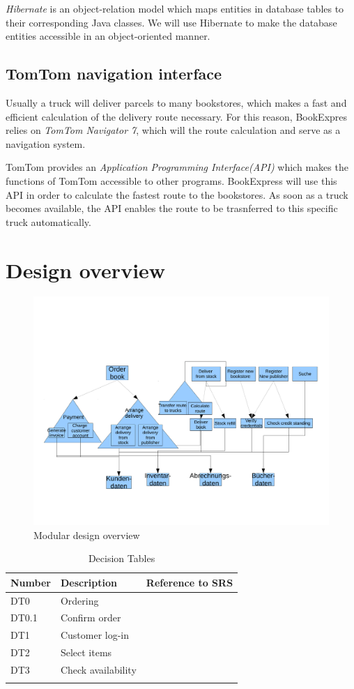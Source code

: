 \emph{Hibernate} is an object-relation model which maps entities in database tables to their corresponding Java classes. We will use Hibernate to make the database entities accessible in an object-oriented manner.
\subsection{TomTom navigation interface}
Usually a truck will deliver parcels to many bookstores, which makes a fast and efficient calculation of the delivery route necessary. For this reason, BookExpres relies on \emph{TomTom Navigator 7}, which will the route calculation and serve as a navigation system.

TomTom provides an \emph{Application Programming Interface(API)} which makes the functions of TomTom accessible to other programs. BookExpress will use this API in order to calculate the fastest route to the bookstores. As soon as a truck becomes available, the API enables the route to be trasnferred to this specific truck automatically.
\section{Design overview}
\begin{figure}[H]
\centering
\includegraphics[scale=0.5]{design.pdf}
\caption{Modular design overview}
\end{figure}

\begin{longtable}[l]{|p{}|p{}|p{}|}
\hline
Number & Description & Reference to SRS  \\
\hline
\hline

DT0 & Ordering & \\
\hline
DT0.1 & Confirm order & \\
\hline
DT1 & Customer log-in & \\
\hline
DT2 & Select items & \\
\hline
DT3 & Check availability & \\
\hline

\caption{Decision Tables}
\end{longtable}


